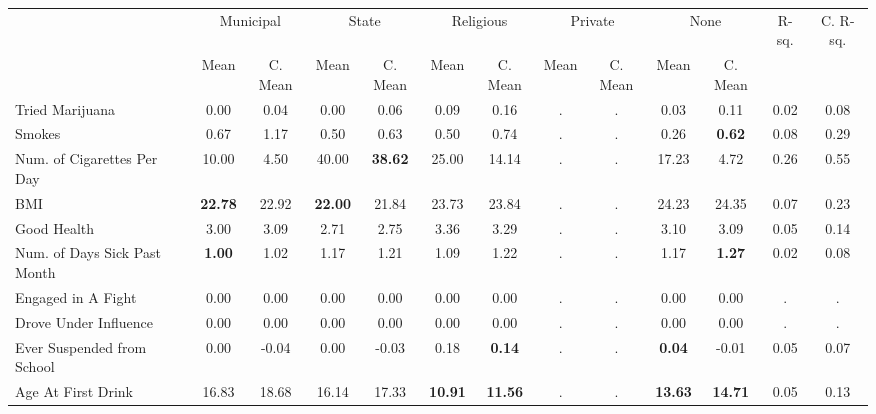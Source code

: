 \begin{tabular}{l c c c c c c c c c c c c}
\toprule
& \multicolumn{2}{c}{Municipal} & \multicolumn{2}{c}{State} & \multicolumn{2}{c}{Religious} & \multicolumn{2}{c}{Private} & \multicolumn{2}{c}{None} & R-sq. & C. R-sq. \\
& \scriptsize Mean & \scriptsize C. Mean & \scriptsize Mean & \scriptsize C. Mean & \scriptsize Mean & \scriptsize C. Mean & \scriptsize Mean & \scriptsize C. Mean & \scriptsize Mean & \scriptsize C. Mean & & \\
\midrule
Tried Marijuana &      0.00 & 0.04 &      0.00 & 0.06 &      0.09 & 0.16 &         . & . &      0.03 & 0.11 &      0.02 &      0.08 \\
Smokes &      0.67 & 1.17 &      0.50 & 0.63 &      0.50 & 0.74 &         . & . &      0.26 & \textbf{     0.62} &      0.08 &      0.29 \\
Num. of Cigarettes Per Day &     10.00 & 4.50 &     40.00 & \textbf{    38.62} &     25.00 & 14.14 &         . & . &     17.23 & 4.72 &      0.26 &      0.55 \\
BMI & \textbf{    22.78} & 22.92 & \textbf{    22.00} & 21.84 &     23.73 & 23.84 &         . & . &     24.23 & 24.35 &      0.07 &      0.23 \\
Good Health &      3.00 & 3.09 &      2.71 & 2.75 &      3.36 & 3.29 &         . & . &      3.10 & 3.09 &      0.05 &      0.14 \\
Num. of Days Sick Past Month & \textbf{     1.00} & 1.02 &      1.17 & 1.21 &      1.09 & 1.22 &         . & . &      1.17 & \textbf{     1.27} &      0.02 &      0.08 \\
Engaged in A Fight &      0.00 & 0.00 &      0.00 & 0.00 &      0.00 & 0.00 &         . & . &      0.00 & 0.00 &         . &         . \\
Drove Under Influence &      0.00 & 0.00 &      0.00 & 0.00 &      0.00 & 0.00 &         . & . &      0.00 & 0.00 &         . &         . \\
Ever Suspended from School &      0.00 & -0.04 &      0.00 & -0.03 &      0.18 & \textbf{     0.14} &         . & . & \textbf{     0.04} & -0.01 &      0.05 &      0.07 \\
Age At First Drink &     16.83 & 18.68 &     16.14 & 17.33 & \textbf{    10.91} & \textbf{    11.56} &         . & . & \textbf{    13.63} & \textbf{    14.71} &      0.05 &      0.13 \\
\bottomrule
\end{tabular}
